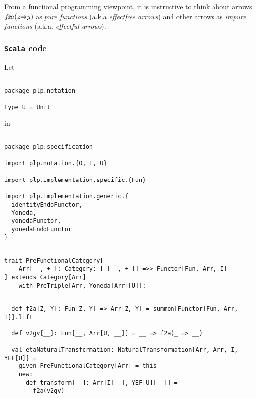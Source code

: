 \documentclass[11pt]{article}
\newcommand{\fta}{\mbox{$f$\!{\scriptsize {\em 2}}$a$}}
\newcommand{\nodefunction}[2]{#1 \!\!\Rightarrow\!\! #2}
\newcommand{\code}{\subsubsection{{\tt Scala} code}\begingroup\rm \vspace{12pt}}
\def\edefn{\endgroup\par\pagebreak[2]\addvspace{\medskipamount}}
\begin{document}
From a functional programming viewpoint, it is instructive to think about arrows $\fta(\nodefunction{z}{y})$ as
{\em pure functions} 
(a.k.a {\em effectfree arrows}) and other arrows as
{\em impure functions}
(a.k.a. {\em effectful arrows}).
\edefn

\code
Let

\vspace{6pt}
\begin{mdframed}[backgroundcolor=lightgray!20] 
\begin{lstlisting}

package plp.notation

type U = Unit
\end{lstlisting}
\end{mdframed}

in

\vspace{6pt}
\begin{mdframed}[backgroundcolor=lightgray!20] 
\begin{lstlisting}

package plp.specification

import plp.notation.{O, I, U}

import plp.implementation.specific.{Fun}

import plp.implementation.generic.{
  identityEndoFunctor,
  Yoneda,
  yonedaFunctor,
  yonedaEndoFunctor
}
\end{lstlisting}
\end{mdframed}
\vspace{6pt}
\begin{mdframed}[backgroundcolor=lightgray!20] 
\begin{lstlisting}

trait PreFunctionalCategory[
    Arr[-_, +_]: Category: [_[-_, +_]] =>> Functor[Fun, Arr, I]
] extends Category[Arr]
    with PreTriple[Arr, Yoneda[Arr][U]]:
\end{lstlisting}
\end{mdframed}
\vspace{6pt}
\begin{mdframed}[backgroundcolor=lightgray!20] 
\begin{lstlisting}
  
  def f2a[Z, Y]: Fun[Z, Y] => Arr[Z, Y] = summon[Functor[Fun, Arr, I]].lift

  def v2gv[__]: Fun[__, Arr[U, __]] = __ => f2a(_ => __)

  val etaNaturalTransformation: NaturalTransformation[Arr, Arr, I, YEF[U]] =
    given PreFunctionalCategory[Arr] = this
    new:
      def transform[__]: Arr[I[__], YEF[U][__]] =
        f2a(v2gv)
\end{lstlisting}
\end{mdframed}
\end{document}
